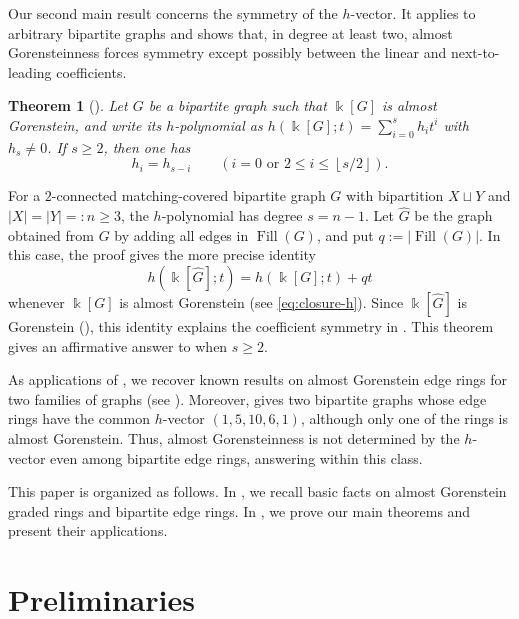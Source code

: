 \documentclass[a4paper,reqno,11pt]{amsart}
\newtheorem{thm}{Theorem}[section]
\theoremstyle{definition}
\theoremstyle{remark}
\numberwithin{equation}{section}
\newcommand{\kk}{\Bbbk}
\newcommand{\Fill}{\operatorname{Fill}}
\begin{document}
Our second main result concerns the symmetry of the $h$-vector.
It applies to arbitrary bipartite graphs and shows that, in degree at least two, almost Gorensteinness forces symmetry except possibly between the linear and next-to-leading coefficients.

\begin{thm}[]\label{thm:palindrome}
    Let $G$ be a bipartite graph such that $\kk[G]$ is almost Gorenstein, and write its $h$-polynomial as $h(\kk[G];t)=\sum_{i=0}^s h_it^i$ with $h_s\neq 0$.
    If $s\ge 2$,
    then one has
    \[
        h_i=h_{s-i}\qquad\left(i=0\text{ or }2\le i\le\left\lfloor s/2\right\rfloor\right).
    \]
\end{thm}

For a $2$-connected matching-covered bipartite graph $G$ with bipartition $X\sqcup Y$ and $|X|=|Y|=:n\ge3$, the $h$-polynomial has degree $s=n-1$.
Let $\widehat G$ be the graph obtained from $G$ by adding
all edges in $\Fill(G)$, and put $q:=|\Fill(G)|$.
In this case, the proof gives the more precise identity
\[
    h(\kk[\widehat G];t)=h(\kk[G];t)+qt
\]
whenever $\kk[G]$ is almost Gorenstein (see \eqref{eq:closure-h}).
Since $\kk[\widehat G]$ is Gorenstein (\cite[Proposition~5.3]{hatasa2026palindromicity}), this identity explains the coefficient symmetry in .
This theorem gives an affirmative answer to \cite[Question~4.8]{hatasa2025pseudo} when $s\ge2$.

As applications of , we recover known results on almost Gorenstein edge rings for two families of graphs (see ).
Moreover,  gives two bipartite graphs whose edge rings have the common $h$-vector $(1,5,10,6,1)$, although only one of the rings is almost Gorenstein.
Thus, almost Gorensteinness is not determined by the $h$-vector even among bipartite edge rings, answering \cite[Problem~4.6]{higashitani2016almost} within this class.

\;

This paper is organized as follows.
In , we recall basic facts on almost Gorenstein graded rings and bipartite edge rings.
In , we prove our main theorems and present their applications.

\section{Preliminaries}\label{sec:preliminaries}
\end{document}
